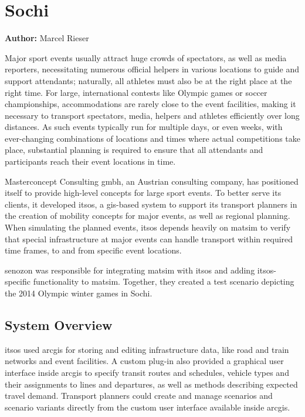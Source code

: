 \chapter{Sochi}
\label{ch:sochi}
\hfill \textbf{Author:} Marcel Rieser


Major sport events usually attract huge crowds of spectators, as well as media
reporters, necessitating numerous official helpers in various locations to guide and
support attendants; naturally, all athletes must also be at
the right place at the right time. For large, international contests like
Olympic games or soccer championships, accommodations are rarely close to the
event facilities, making it necessary to transport spectators, media, helpers
and athletes efficiently over long distances. As such events typically run for
multiple days, or even weeks, with ever-changing combinations of locations and
times where actual competitions take place, substantial planning is required to
ensure that all attendants and participants reach their event locations in time.

Masterconcept Consulting \gls{gmbh}, an Austrian consulting company, has positioned
itself to provide high-level concepts for large sport events. To better serve its clients, 
it developed \gls{itsos}, a \gls{gis}-based system to support its transport
planners in the creation of mobility concepts for major events, as well as 
regional planning. When simulating the planned
events, \gls{itsos} depends heavily on \gls{matsim} to verify that special infrastructure
at major events can handle transport within required time frames, to and from
specific event locations.

\gls{senozon} was responsible for integrating \gls{matsim} with \gls{itsos} and adding \gls{itsos}-specific
functionality to \gls{matsim}. Together, they created a test scenario depicting the
2014 Olympic winter games in Sochi.

\section{System Overview}
\gls{itsos} used \gls{arcgis} for storing and editing infrastructure data, like road
and train networks and event facilities. A custom plug-in also provided a
graphical user interface inside \gls{arcgis} to specify transit routes and schedules,
vehicle types and their assignments to lines and departures, as well as methods
describing expected travel demand. Transport planners could create and manage
scenarios and scenario variants directly from the custom user interface
available inside \gls{arcgis}.

